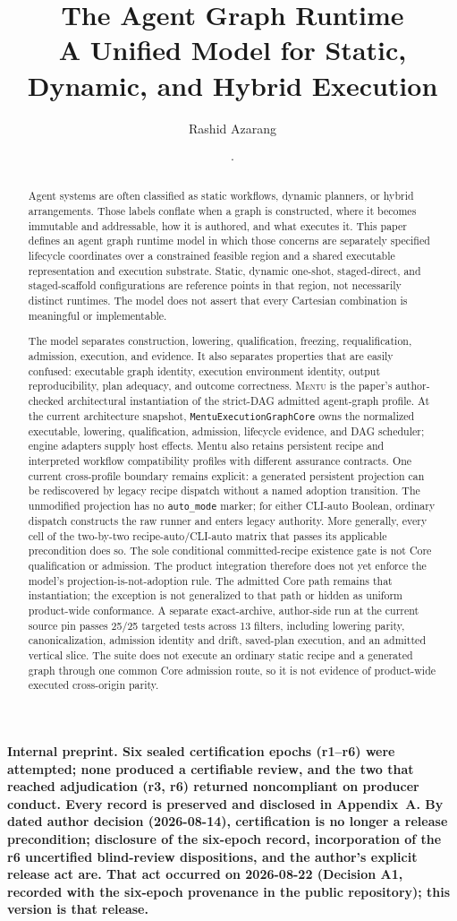 \documentclass[11pt]{article}
\title{\textbf{The Agent Graph Runtime}\\[0.25em]
  \large A Unified Model for Static, Dynamic, and Hybrid Execution}
\author{Rashid Azarang}
\date{\PaperVersion{} \enspace $\cdot$ \enspace \PaperDate}
\newcommand{\mentu}{\textsc{Mentu}}
\newcommand{\code}[1]{\texttt{#1}}
\newcommand{\InternalWarning}{}
\renewcommand{\InternalWarning}{%
    \begin{center}
      \setlength{\fboxsep}{9pt}%
      \colorbox{warningbg}{%
        \parbox{0.91\linewidth}{%
          \centering\color{warningline}\bfseries
          Internal preprint. Six sealed certification epochs (r1--r6) were
          attempted; none produced a certifiable review, and the two that
          reached adjudication (r3, r6) returned noncompliant on producer
          conduct. Every record is preserved and disclosed in
          Appendix~A. By dated author decision
          (2026-08-14), certification is no longer a release precondition;
          disclosure of the six-epoch record, incorporation of the r6
          uncertified blind-review dispositions, and the author's explicit
          release act are. That act occurred on
          2026-08-22 (Decision A1, recorded with the six-epoch
          provenance in the public repository); this version is that
          release.%
        }%
      }%
    \end{center}
  }
\begin{document}
\maketitle
\InternalWarning

\begin{abstract}
Agent systems are often classified as static workflows, dynamic planners, or
hybrid arrangements.  Those labels conflate when a graph is constructed, where
it becomes immutable and addressable, how it is authored, and what executes it.
This paper defines an agent graph runtime model in which those concerns are
separately specified lifecycle coordinates over a constrained feasible region
and a shared executable representation and execution substrate.  Static,
dynamic one-shot, staged-direct, and staged-scaffold configurations are
reference points in that region, not necessarily distinct runtimes.  The model
does not assert that every Cartesian combination is meaningful or implementable.

The model separates construction, lowering, qualification, freezing,
requalification, admission, execution, and evidence. It also separates
properties that are easily confused: executable graph identity, execution
environment identity, output reproducibility, plan adequacy, and outcome
correctness.
\mentu{} is the paper's author-checked architectural instantiation of the
strict-DAG admitted agent-graph profile. At the current architecture snapshot,
\code{MentuExecutionGraphCore} owns the normalized executable, lowering,
qualification, admission, lifecycle evidence, and DAG scheduler; engine
adapters supply host effects. Mentu also retains persistent recipe and
interpreted workflow compatibility profiles with different assurance
contracts. One current cross-profile boundary remains explicit: a generated
persistent projection can be rediscovered by legacy recipe dispatch without a
named adoption transition. The unmodified projection has no
\code{auto\_mode} marker; for either CLI-auto Boolean, ordinary dispatch
constructs the raw runner and enters legacy authority. More generally, every
cell of the two-by-two recipe-auto/CLI-auto matrix that passes its applicable
precondition does so. The sole conditional committed-recipe existence gate is
not Core qualification or admission. The product integration therefore does
not yet enforce the model's projection-is-not-adoption rule. The admitted
Core path remains that instantiation; the exception is not generalized
to that path or hidden as uniform product-wide conformance.
A separate exact-archive, author-side run at the current source pin passes
25/25 targeted tests across 13 filters, including lowering parity,
canonicalization, admission identity and drift, saved-plan execution, and an
admitted vertical slice. The suite does not execute an ordinary static recipe
and a generated graph through one common Core admission route, so it is not
evidence of product-wide executed cross-origin parity.


\end{abstract}
\end{document}
